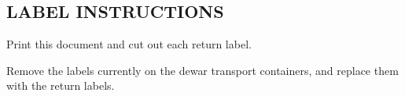 \documentclass[letterpaper,6pt]{report}
\begin{document}
{%

\begin{center}
    \vspace{0.2in}

    \begin{minipage}{\textwidth}
        \section*{LABEL INSTRUCTIONS}
        
        Print this document and cut out each return label.  
        
        Remove the labels currently on the dewar transport containers, and replace them with the return labels.

    \end{minipage}


\end{center}}
\end{document}
